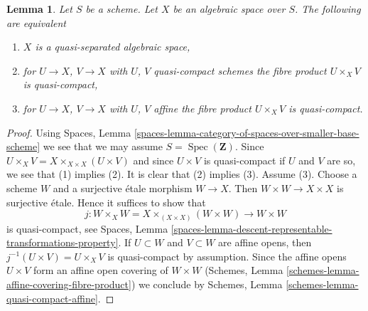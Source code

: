 \documentclass[10pt,a4paper]{amsart}
\theoremstyle{plain}
\newtheorem{lemma}[subsection]{Lemma}
\theoremstyle{definition}
\theoremstyle{remark}
\numberwithin{equation}{subsection}
\def\Spec{\mathop{\mathrm{Spec}}}
\begin{document}
\begin{lemma}
\label{lemma-characterize-quasi-separated}
Let $S$ be a scheme. Let $X$ be an algebraic space over $S$.
The following are equivalent
\begin{enumerate}
\item $X$ is a quasi-separated algebraic space,
\item for $U \to X$, $V \to X$ with $U$, $V$ quasi-compact schemes
the fibre product $U \times_X V$ is quasi-compact,
\item for $U \to X$, $V \to X$ with $U$, $V$ affine
the fibre product $U \times_X V$ is quasi-compact.
\end{enumerate}
\end{lemma}

\begin{proof}
Using Spaces, Lemma
\ref{spaces-lemma-category-of-spaces-over-smaller-base-scheme}
we see that we may assume $S = \Spec(\mathbf{Z})$.
Since $U \times_X V = X \times_{X \times X} (U \times V)$
and since $U \times V$ is quasi-compact if $U$ and $V$ are so,
we see that (1) implies (2). It is clear that (2) implies (3).
Assume (3). Choose a scheme $W$ and a surjective \'etale morphism
$W \to X$. Then $W \times W \to X \times X$ is surjective \'etale.
Hence it suffices to show that
$$
j : W \times_X W = X \times_{(X \times X)} (W \times W) \to W \times W
$$
is quasi-compact, see Spaces, Lemma
\ref{spaces-lemma-descent-representable-transformations-property}.
If $U \subset W$ and $V \subset W$ are affine opens, then
$j^{-1}(U \times V) = U \times_X V$ is quasi-compact by assumption.
Since the affine opens $U \times V$ form an affine open covering of
$W \times W$ (Schemes, Lemma \ref{schemes-lemma-affine-covering-fibre-product})
we conclude by
Schemes, Lemma \ref{schemes-lemma-quasi-compact-affine}.
\end{proof}
\end{document}
